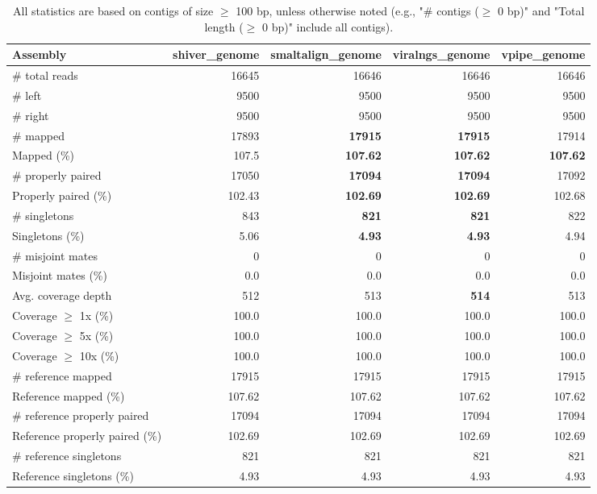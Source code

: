 \documentclass[12pt,a4paper]{article}
\begin{document}
\begin{table}[ht]
\begin{center}
\caption{All statistics are based on contigs of size $\geq$ 100 bp, unless otherwise noted (e.g., "\# contigs ($\geq$ 0 bp)" and "Total length ($\geq$ 0 bp)" include all contigs).}
\begin{tabular}{|l*{4}{|r}|}
\hline
Assembly & shiver\_genome & smaltalign\_genome & viralngs\_genome & vpipe\_genome \\ \hline
\# total reads & 16645 & 16646 & 16646 & 16646 \\ \hline
\# left & 9500 & 9500 & 9500 & 9500 \\ \hline
\# right & 9500 & 9500 & 9500 & 9500 \\ \hline
\# mapped & 17893 & {\bf 17915} & {\bf 17915} & 17914 \\ \hline
Mapped (\%) & 107.5 & {\bf 107.62} & {\bf 107.62} & {\bf 107.62} \\ \hline
\# properly paired & 17050 & {\bf 17094} & {\bf 17094} & 17092 \\ \hline
Properly paired (\%) & 102.43 & {\bf 102.69} & {\bf 102.69} & 102.68 \\ \hline
\# singletons & 843 & {\bf 821} & {\bf 821} & 822 \\ \hline
Singletons (\%) & 5.06 & {\bf 4.93} & {\bf 4.93} & 4.94 \\ \hline
\# misjoint mates & 0 & 0 & 0 & 0 \\ \hline
Misjoint mates (\%) & 0.0 & 0.0 & 0.0 & 0.0 \\ \hline
Avg. coverage depth & 512 & 513 & {\bf 514} & 513 \\ \hline
Coverage $\geq$ 1x (\%) & 100.0 & 100.0 & 100.0 & 100.0 \\ \hline
Coverage $\geq$ 5x (\%) & 100.0 & 100.0 & 100.0 & 100.0 \\ \hline
Coverage $\geq$ 10x (\%) & 100.0 & 100.0 & 100.0 & 100.0 \\ \hline
\# reference mapped & 17915 & 17915 & 17915 & 17915 \\ \hline
Reference mapped (\%) & 107.62 & 107.62 & 107.62 & 107.62 \\ \hline
\# reference properly paired & 17094 & 17094 & 17094 & 17094 \\ \hline
Reference properly paired (\%) & 102.69 & 102.69 & 102.69 & 102.69 \\ \hline
\# reference singletons & 821 & 821 & 821 & 821 \\ \hline
Reference singletons (\%) & 4.93 & 4.93 & 4.93 & 4.93 \\ \hline

\end{tabular}
\end{center}
\end{table}
\end{document}
